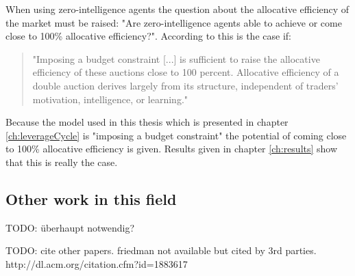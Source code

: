 \documentclass[../Bachelorarbeit.tex]{subfiles}
\begin{document}
\medskip
When using zero-intelligence agents the question about the \gls{allocative efficiency} of the market must be raised: "Are zero-intelligence agents able to achieve or come close to 100\% allocative efficiency?". According to \cite{GodeSunder1993} this is the case if:

\begin{quote}
"Imposing a budget constraint [...] is sufficient to raise the allocative efficiency of these auctions close to 100 percent. Allocative efficiency of a double auction derives largely from its structure, independent of traders' motivation, intelligence, or learning."
\end{quote}

Because the model used in this thesis which is presented in chapter \ref{ch:leverageCycle} is "imposing a budget constraint" the potential of coming close to 100\% allocative efficiency is given. Results given in chapter \ref{ch:results} show that this is really the case.

\subsection{Other work in this field}
TODO: überhaupt notwendig?

TODO: cite other papers. friedman not available but cited by 3rd parties.
http://dl.acm.org/citation.cfm?id=1883617
\end{document}
